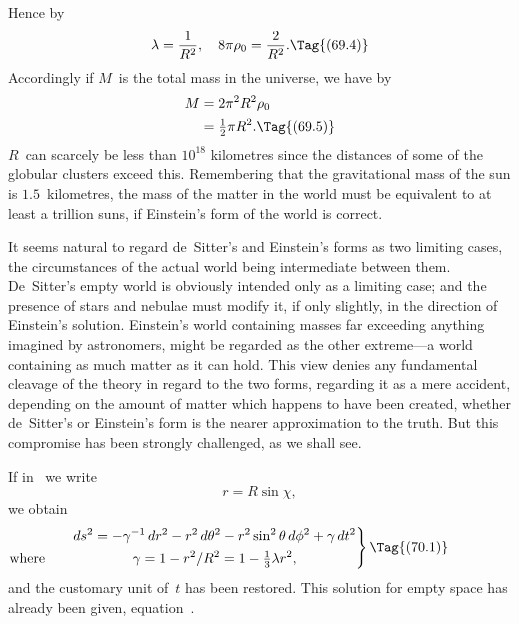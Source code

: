 \documentclass[12pt]{book}
\begin{document}
Hence by~
\[
\lambda = \frac{1}{R^{2}},\quad
8\pi\rho_{0} = \frac{2}{R^{2}}.
\Tag{(69.4)}
\]
Accordingly if $M$~is the total mass in the universe, we have by~
\begin{align*}
  M &= 2\pi^{2} R^{2} \rho_{0} \\
  &= \tfrac{1}{2}\pi R^{2}.
  \Tag{(69.5)}
\end{align*}
$R$~can scarcely be less than $10^{18}$ kilometres since the distances of some of the
globular clusters exceed this. Remembering that the gravitational mass of
the sun is $1.5$~kilometres, the mass of the matter in the world must be equivalent
to at least a trillion suns, if Einstein's form of the world is correct.

It seems natural to regard de~Sitter's and Einstein's forms as two limiting
cases, the circumstances of the actual world being intermediate between them.
De~Sitter's empty world is obviously intended only as a limiting case; and
the presence of stars and nebulae must modify it, if only slightly, in the
direction of Einstein's solution. Einstein's world containing masses far exceeding
anything imagined by astronomers, might be regarded as the other
extreme---a world containing as much matter as it can hold. This view denies
any fundamental cleavage of the theory in regard to the two forms, regarding
it as a mere accident, depending on the amount of matter which happens to
have been created, whether de~Sitter's or Einstein's form is the nearer approximation
to the truth. But this compromise has been strongly challenged,
as we shall see.

%
%
%
%
%
%

If in~ we write
\[
r = R\sin\chi,
\]
we obtain
\[
\left.
\begin{gathered}
  ds^{2} = -\gamma^{-1}\, dr^{2} - r^{2}\, d\theta^{2} - r^{2}\sin^{2}\theta\, d\phi^{2} + \gamma\, dt^{2} \\
\llap{\text{where}\rule{0.87in}{0pt}}
\gamma = 1 - r^{2}/R^{2} = 1 - \tfrac{1}{3}\lambda r^{2},
\end{gathered}\right\}
\Tag{(70.1)}
\]
and the customary unit of~$t$ has been restored. This solution for empty space
has already been given, equation~.
\end{document}
